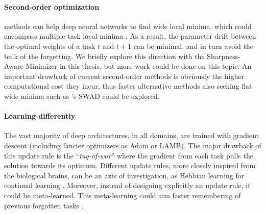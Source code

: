 \paragraph{Second-order optimization} methods can help deep neural networks to find wide local
minima, which could encompass multiple task local minima \citep{lee2020kroneckercontinual}. As a
result, the parameter drift between the optimal weights of a task $t$ and $t+1$ can be minimal, and
in turn avoid the bulk of the forgetting. We briefly explore this direction with the
Sharpness-Aware-Minimizer \citep{foret2020sam} in this thesis, but more work could be done on this
topic. An important drawback of current second-order methods is obviously the higher computational
cost they incur, thus faster alternative methods also seeking flat wide minima such as
\citet{cha2021swad}'s SWAD could be explored.

\paragraph{Learning differently} The vast majority of deep architectures, in all domains, are
trained with gradient descent (including fancier optimizers as Adam or LAMB). The major drawback of
this update rule is the ``\textit{tug-of-war}'' \citep{hadsell2020embracingchange} where the
gradient from each task pulls the solution towards its optimum. Different update rules, more closely
inspired from the biological brains, can be an axis of investigation, as Hebbian learning for
continual learning \citep{taylor2020hebbiancontinual}. Moreover, instead of designing explicitly an
update rule, it could be meta-learned. This meta-learning could aim faster remembering of previous
forgotten tasks \citep{he2019metacontinual,caccia2020osaka}.


